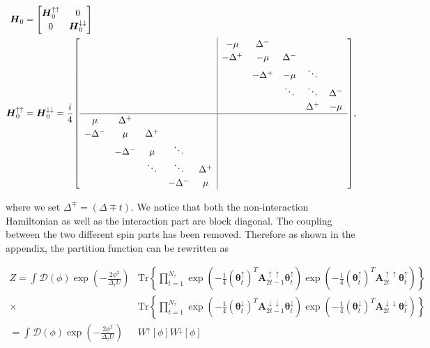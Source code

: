 \documentclass{article}
\begin{document}
\begin{align}
	\boldsymbol{H}_0 &=\begin{bmatrix}
		\boldsymbol{H}_0^{\uparrow\uparrow} & 0  \\
		0 & \boldsymbol{H}_0^{\downarrow\downarrow}  
	\end{bmatrix} \\ \boldsymbol{H}_0^{\uparrow\uparrow}&=\boldsymbol{H}_0^{\downarrow\downarrow} =  \frac{i}{4}{\renewcommand{\arraystretch}{1.2}
		\setlength{\arraycolsep}{5pt}
		\left[
		\begin{array}{*{5}{c}|*{5}{c}}
			 & \phantom{-} &  &  &  & -\mu & \Delta^{-}  &  &  &  \\
			 &  & \phantom{-} &  &  & -\Delta^{+} & -\mu & \Delta^{-} &  &  \\
			&  &  &  &  &  & -\Delta^{+} & -\mu & \ddots &  \\
			&  &  &  & \phantom{-} &  &  & \ddots & \ddots & \Delta^{-} \\
			&  &  &  &  &  &  &  & \Delta^{+} & -\mu \\
			\hline
			\mu & \Delta^{+}  &  &  &  &  &  &  &  &  \\
			-\Delta^{-}& \mu & \Delta^{+} &  &  &  & &  &  &  \\
			&-\Delta^{-}  & \mu & \ddots &  &  &  &  &  &  \\
			&  & \ddots  & \ddots & \Delta^{+} &  &  &  &  &  \\
			&  &  & -\Delta^{-} & \mu &  &  &  & & 
		\end{array}
		\right]},
\end{align}


where we set $\Delta^{\mp} = \left(\Delta \mp t \right)$. We notice that both the non-interaction Hamiltonian as well as the interaction part are block diagonal. The coupling between the two different spin parts has been removed. Therefore as shown in the appendix, the partition function can be rewritten as

\begin{align}
	Z = \int_{ }^{ } \mathcal{D}\left(\phi\right) \exp \left( {-\frac{2\phi^{2} }{\Delta_\tau U } }  \right) &\mathrm{Tr} \left\{\prod_{t=1}^{N_\tau}\exp \left( -\frac{1}{4}\left(\boldsymbol{\theta}_{t}^{\uparrow}\right)^{T}\boldsymbol{A}^{\uparrow\uparrow}_{2t-1}\boldsymbol{\theta}_{t}^{\uparrow}   \right)\exp \left( -\frac{1}{4}\left(\boldsymbol{\theta}_{t}^{\uparrow}\right)^{T}\boldsymbol{A}^{\uparrow\uparrow}_{2t}\boldsymbol{\theta}_{t}^{\uparrow}   \right)   \right\}\nonumber \\
	\times &\mathrm{Tr} \left\{\prod_{t=1}^{N_\tau}\exp \left( -\frac{1}{4}\left(\boldsymbol{\theta}_{t}^{\downarrow}\right)^{T}\boldsymbol{A}^{\downarrow\downarrow}_{2t-1}\boldsymbol{\theta}_{t}^{\downarrow}   \right)\exp \left( -\frac{1}{4}\left(\boldsymbol{\theta}_{t}^{\downarrow}\right)^{T}\boldsymbol{A}^{\downarrow\downarrow}_{2t}\boldsymbol{\theta}_{t}^{\downarrow}   \right)   \right\} \\
	= \int_{ }^{ } \mathcal{D}\left(\phi\right) \exp \left( {-\frac{2\phi^{2} }{\Delta_\tau U } }  \right) &W^{\uparrow} \left[ \phi \right]  W^{\downarrow}\left[ \phi \right]   
\end{align}
\end{document}
